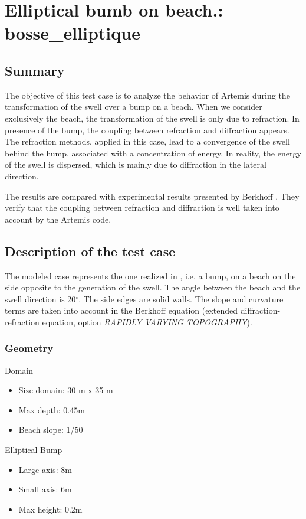 \chapter{Elliptical bumb on beach.: bosse\_elliptique}

\section{Summary}
The objective of this test case is to analyze the behavior of Artemis during
the transformation of the swell over a bump on a beach. When we consider
exclusively the beach, the transformation of the swell is only due to
refraction. In presence of the bump, the coupling between refraction and
diffraction appears. The refraction methods, applied in this case, lead to a
convergence of the swell behind the hump, associated with a concentration of
energy. In reality, the energy of the swell is dispersed, which is mainly
due to diffraction in the lateral direction.

The results are compared with experimental results presented by Berkhoff
\cite{berkhoff1982}. They verify that the coupling between refraction and
diffraction is well taken into account by the Artemis code.


\section{Description of the test case}

The modeled case represents the one realized in \cite{berkhoff1982}, i.e. a
bump, on a beach on the side opposite to the generation of the swell. The
angle between the beach and the swell direction is 20$^\circ$.
The side edges are solid walls. The slope and curvature terms are taken into
account  in the Berkhoff equation (extended diffraction-refraction equation,
option {\it RAPIDLY VARYING TOPOGRAPHY}).

\subsection{Geometry}
Domain
\begin{itemize}
 \item  Size domain: 30 m x 35 m
\item Max depth: 0.45m
\item Beach slope: 1/50
\end{itemize}
  Elliptical Bump
\begin{itemize}
\item   Large axis:  8m
\item Small axis: 6m
\item Max height: 0.2m
\end{itemize}

